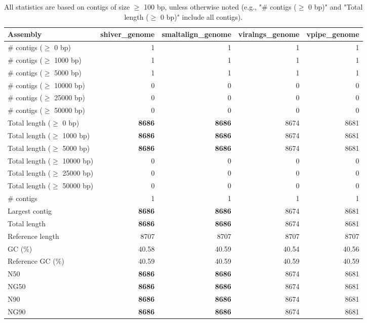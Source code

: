 \documentclass[12pt,a4paper]{article}
\begin{document}
\begin{table}[ht]
\begin{center}
\caption{All statistics are based on contigs of size $\geq$ 100 bp, unless otherwise noted (e.g., "\# contigs ($\geq$ 0 bp)" and "Total length ($\geq$ 0 bp)" include all contigs).}
\begin{tabular}{|l*{4}{|r}|}
\hline
Assembly & shiver\_genome & smaltalign\_genome & viralngs\_genome & vpipe\_genome \\ \hline
\# contigs ($\geq$ 0 bp) & 1 & 1 & 1 & 1 \\ \hline
\# contigs ($\geq$ 1000 bp) & 1 & 1 & 1 & 1 \\ \hline
\# contigs ($\geq$ 5000 bp) & 1 & 1 & 1 & 1 \\ \hline
\# contigs ($\geq$ 10000 bp) & 0 & 0 & 0 & 0 \\ \hline
\# contigs ($\geq$ 25000 bp) & 0 & 0 & 0 & 0 \\ \hline
\# contigs ($\geq$ 50000 bp) & 0 & 0 & 0 & 0 \\ \hline
Total length ($\geq$ 0 bp) & {\bf 8686} & {\bf 8686} & 8674 & 8681 \\ \hline
Total length ($\geq$ 1000 bp) & {\bf 8686} & {\bf 8686} & 8674 & 8681 \\ \hline
Total length ($\geq$ 5000 bp) & {\bf 8686} & {\bf 8686} & 8674 & 8681 \\ \hline
Total length ($\geq$ 10000 bp) & 0 & 0 & 0 & 0 \\ \hline
Total length ($\geq$ 25000 bp) & 0 & 0 & 0 & 0 \\ \hline
Total length ($\geq$ 50000 bp) & 0 & 0 & 0 & 0 \\ \hline
\# contigs & 1 & 1 & 1 & 1 \\ \hline
Largest contig & {\bf 8686} & {\bf 8686} & 8674 & 8681 \\ \hline
Total length & {\bf 8686} & {\bf 8686} & 8674 & 8681 \\ \hline
Reference length & 8707 & 8707 & 8707 & 8707 \\ \hline
GC (\%) & 40.58 & 40.59 & 40.54 & 40.56 \\ \hline
Reference GC (\%) & 40.59 & 40.59 & 40.59 & 40.59 \\ \hline
N50 & {\bf 8686} & {\bf 8686} & 8674 & 8681 \\ \hline
NG50 & {\bf 8686} & {\bf 8686} & 8674 & 8681 \\ \hline
N90 & {\bf 8686} & {\bf 8686} & 8674 & 8681 \\ \hline
NG90 & {\bf 8686} & {\bf 8686} & 8674 & 8681 \\ \hline

\end{tabular}
\end{center}
\end{table}
\end{document}
